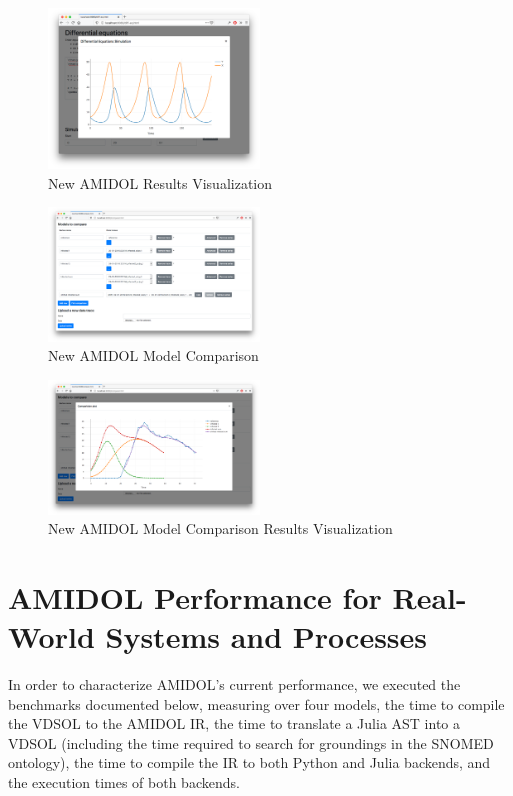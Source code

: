 \documentclass[12pt]{galois-whitepaper}
\begin{document}
\begin{figure}
  \centering
  \includegraphics[width=0.5\textwidth]{figs/LaTex_VDSOL_results.png}
  \caption{New AMIDOL Results Visualization}
  \label{Fig:Results}
\end{figure}


\begin{figure}
  \centering
  \includegraphics[width=0.5\textwidth]{figs/SIIR_setup_comparision.png}
  \caption{New AMIDOL Model Comparison}
  \label{Fig:Comp}
\end{figure}

\begin{figure}
  \centering
  \includegraphics[width=0.5\textwidth]{figs/SIIR_visualize_comparision.png}
  \caption{New AMIDOL Model Comparison Results Visualization}
  \label{Fig:Arch}
\end{figure}

\section{AMIDOL Performance for Real-World Systems and Processes}

In order to characterize AMIDOL's current performance, we executed the
benchmarks documented below, measuring over four models, the time to
compile the VDSOL to the AMIDOL IR, the time to translate a Julia AST
into a VDSOL (including the time required to search for groundings in
the SNOMED ontology), the time to compile the IR to both Python and
Julia backends, and the execution times of both backends.
\end{document}
